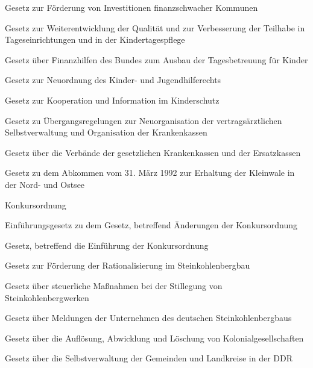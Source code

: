 \item[{KInvFG}] Gesetz zur Förderung von Investitionen finanzschwacher Kommunen

\item[{KiQuTG}] Gesetz zur Weiterentwicklung der Qualität und zur Verbesserung der Teilhabe in Tageseinrichtungen und in der Kindertagespflege

\item[{KitaFinHG}] Gesetz über Finanzhilfen des Bundes zum Ausbau der Tagesbetreuung für Kinder

\item[{KJHG}] Gesetz zur Neuordnung des Kinder- und Jugendhilferechts

\item[{KKG}] Gesetz zur Kooperation und Information im Kinderschutz

\item[{KKÜNOG}] Gesetz zu Übergangsregelungen zur Neuorganisation der vertragsärztlichen Selbstverwaltung und Organisation der Krankenkassen

\item[{KKVerbdG}] Gesetz über die Verbände der gesetzlichen Krankenkassen und der Ersatzkassen

\item[{KlWalAbkG}] Gesetz zu dem Abkommen vom 31. März 1992 zur Erhaltung der Kleinwale in der Nord- und Ostsee

\item[{KO}] Konkursordnung

\item[{KOÄndGEG}] Einführungsgesetz zu dem Gesetz, betreffend Änderungen der Konkursordnung

\item[{KOEG}] Gesetz, betreffend die Einführung der Konkursordnung

\item[{KohleRatG}] Gesetz zur Förderung der Rationalisierung im Steinkohlenbergbau

\item[{KohleStillG}] Gesetz über steuerliche Maßnahmen bei der Stillegung von Steinkohlenbergwerken

\item[{KohleUMeldeG}] Gesetz über Meldungen der Unternehmen des deutschen Steinkohlenbergbaus

\item[{KolGesAuflG}] Gesetz über die Auflösung, Abwicklung und Löschung von Kolonialgesellschaften

\item[{KomVerfG}] Gesetz über die Selbstverwaltung der Gemeinden und Landkreise in der DDR

